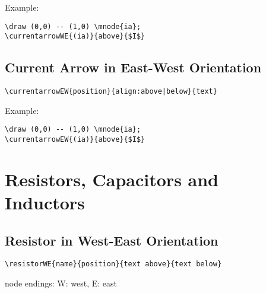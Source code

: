 \documentclass[parskip=full]{scrartcl}
\begin{document}
Example:\\
\begin{minipage}{0.8\textwidth}
\begin{verbatim}
\draw (0,0) -- (1,0) \mnode{ia};
\currentarrowWE{(ia)}{above}{$I$}
\end{verbatim}
\end{minipage}
\begin{minipage}{0.19\textwidth}
\end{minipage}

\subsection{Current Arrow in East-West Orientation}

\begin{verbatim}
\currentarrowEW{position}{align:above|below}{text}
\end{verbatim}

Example:\\
\begin{minipage}{0.8\textwidth}
\begin{verbatim}
\draw (0,0) -- (1,0) \mnode{ia};
\currentarrowEW{(ia)}{above}{$I$}
\end{verbatim}
\end{minipage}
\begin{minipage}{0.19\textwidth}
\end{minipage}

\section{Resistors, Capacitors and Inductors}

\subsection{Resistor in West-East Orientation}

\begin{verbatim}
\resistorWE{name}{position}{text above}{text below}
\end{verbatim}
node endings: W: west, E: east
\end{document}
